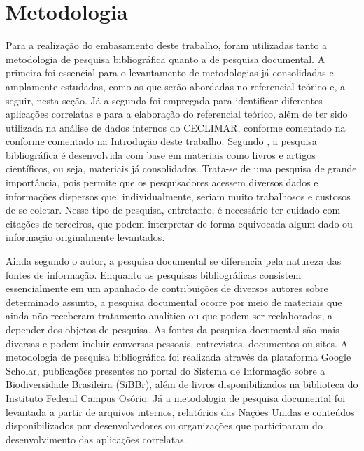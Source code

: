 \chapter{Metodologia}\label{metodologia}

Para a realização do embasamento deste trabalho, foram utilizadas tanto a metodologia de pesquisa bibliográfica 
quanto a de pesquisa documental. A primeira foi essencial para o levantamento de metodologias já consolidadas e 
amplamente estudadas, como as que serão abordadas no referencial teórico e, a seguir, nesta seção. Já a segunda 
foi empregada para identificar diferentes aplicações correlatas e para a elaboração do referencial teórico, além 
de ter sido utilizada na análise de dados internos do CECLIMAR, conforme comentado na conforme comentado na 
\hyperref[chapter:intro]{Introdução} deste trabalho.
Segundo , a pesquisa bibliográfica é desenvolvida com base em materiais como livros 
e artigos científicos, ou seja, materiais já consolidados. Trata-se de uma pesquisa de grande importância, pois 
permite que os pesquisadores acessem diversos dados e informações dispersos que, individualmente, seriam muito 
trabalhosos e custosos de se coletar. Nesse tipo de pesquisa, entretanto, é necessário ter cuidado com citações 
de terceiros, que podem interpretar de forma equivocada algum dado ou informação originalmente levantados.

Ainda segundo o autor, a pesquisa documental se diferencia pela natureza das fontes de informação. Enquanto as 
pesquisas bibliográficas consistem essencialmente em um apanhado de contribuições de diversos autores sobre 
determinado assunto, a pesquisa documental ocorre por meio de materiais que ainda não receberam tratamento 
analítico ou que podem ser reelaborados, a depender dos objetos de pesquisa. As fontes da pesquisa documental 
são mais diversas e podem incluir conversas pessoais, entrevistas, documentos ou sites.
A metodologia de pesquisa bibliográfica foi realizada através da plataforma Google Scholar, publicações 
presentes no portal do Sistema de Informação sobre a Biodiversidade Brasileira (SiBBr), além de livros 
disponibilizados na biblioteca do Instituto Federal Campus Osório. Já a metodologia de pesquisa documental 
foi levantada a partir de arquivos internos, relatórios das Nações Unidas e conteúdos disponibilizados por 
desenvolvedores ou organizações que participaram do desenvolvimento das aplicações correlatas.

